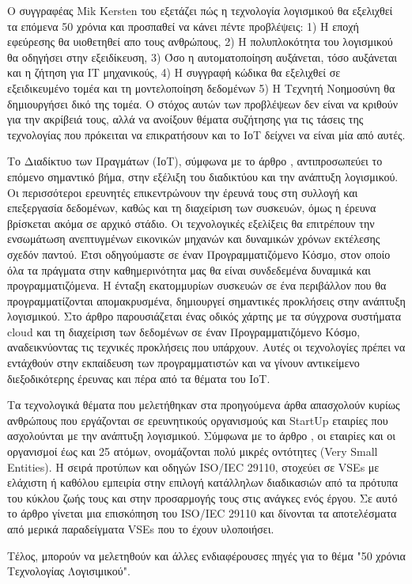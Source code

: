 \documentclass[11pt]{article}
\begin{document}
	\par
	Ο συγγραφέας \foreignlanguage{english}{Mik Kersten} του \cite{kersten2018five} εξετάζει πώς η τεχνολογία λογισμικού θα εξελιχθεί τα επόμενα 50 χρόνια και προσπαθεί να κάνει πέντε προβλέψεις: 1) Η εποχή εφεύρεσης θα υιοθετηθεί απο τους ανθρώπους, 2) Η πολυπλοκότητα του λογισμικού θα οδηγήσει στην εξειδίκευση, 3) Όσο η αυτοματοποίηση αυξάνεται, τόσο αυξάνεται και η ζήτηση για ΙΤ μηχανικούς, 4) Η συγγραφή κώδικα θα εξελιχθεί σε εξειδικευμένο τομέα και τη μοντελοποίηση δεδομένων 5) Η Τεχνητή Νοημοσύνη θα δημιουργήσει δικό της τομέα. Ο στόχος αυτών των προβλέψεων δεν είναι να κριθούν για την ακρίβειά τους, αλλά να ανοίξουν θέματα συζήτησης για τις τάσεις της τεχνολογίας που πρόκειται να επικρατήσουν και το ΙοΤ δείχνει να είναι μία από αυτές.
	\par
	Το Διαδίκτυο των Πραγμάτων (ΙοΤ), σύμφωνα με το άρθρο \cite{taivalsaari2017roadmap}, αντιπροσωπεύει το επόμενο σημαντικό βήμα, στην εξέλιξη του διαδικτύου και την ανάπτυξη λογισμικού. Οι περισσότεροι ερευνητές επικεντρώνουν την έρευνά τους στη συλλογή και επεξεργασία δεδομένων, καθώς και τη διαχείριση των συσκευών, όμως η έρευνα βρίσκεται ακόμα σε αρχικό στάδιο. Οι τεχνολογικές εξελίξεις θα επιτρέπουν την ενσωμάτωση ανεπτυγμένων εικονικών μηχανών και δυναμικών χρόνων εκτέλεσης σχεδόν παντού. Έτσι οδηγούμαστε σε έναν Προγραμματιζόμενο Κόσμο, στον οποίο όλα τα πράγματα στην καθημερινότητα μας θα είναι συνδεδεμένα δυναμικά και προγραμματιζόμενα. Η ένταξη εκατομμυρίων συσκευών σε ένα περιβάλλον που θα προγραμματίζονται απομακρυσμένα, δημιουργεί σημαντικές προκλήσεις στην ανάπτυξη λογισμικού. Στο άρθρο παρουσιάζεται ένας οδικός χάρτης με τα σύγχρονα συστήματα \foreignlanguage{english}{cloud} και τη διαχείριση των δεδομένων σε έναν Προγραμματιζόμενο Κόσμο, αναδεικνύοντας τις τεχνικές προκλήσεις που υπάρχουν. Αυτές οι τεχνολογίες πρέπει να εντάχθούν στην εκπαίδευση των προγραμματιστών και να γίνουν αντικείμενο διεξοδικότερης έρευνας και πέρα από τα θέματα του ΙοΤ. 
	\par
	Τα τεχνολογικά θέματα που μελετήθηκαν στα προηγούμενα άρθα απασχολούν κυρίως ανθρώπους που εργάζονται σε ερευνητικούς οργανισμούς και \foreignlanguage{english}{StartUp} εταιρίες που ασχολούνται με την ανάπτυξη λογισμικού. Σύμφωνα με το άρθρο \cite{laporte2018applying}, οι εταιρίες και οι οργανισμοί έως και 25 ατόμων, ονομάζονται πολύ μικρές οντότητες (\foreignlanguage{english}{Very Small Entities}). Η σειρά προτύπων και οδηγών \foreignlanguage{english}{ISO/IEC 29110}, στοχεύει σε \foreignlanguage{english}{VSEs} με ελάχιστη ή καθόλου εμπειρία στην επιλογή κατάλληλων διαδικασιών από τα πρότυπα του κύκλου ζωής τους και στην προσαρμογής τους στις ανάγκες ενός έργου. Σε αυτό το άρθρο γίνεται μια επισκόπηση του \foreignlanguage{english}{ISO/IEC 29110} και δίνονται τα αποτελέσματα από μερικά παραδείγματα  \foreignlanguage{english}{VSEs} που το έχουν υλοποιήσει.
	\par
	Τέλος, μπορούν να μελετηθούν και άλλες ενδιαφέρουσες πηγές \cite{mead2018half} \cite{broy2018yesterday} \cite{klotins2018software} \cite{8474489} \cite{le2018bridging} \cite{hoda2018rise} \cite{bjarnason2017aligning} \cite{williams2018engineering} \cite{holzmann2018code} \cite{leicht2017leveraging} για το θέμα "50 χρόνια Τεχνολογίας Λογισιμικού".
	
\end{document}

